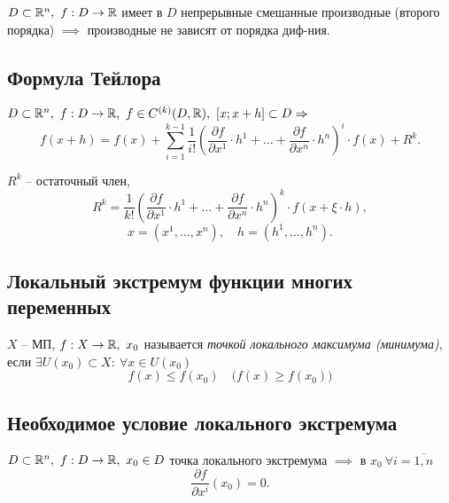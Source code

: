 \begin{theorem}
    $ D \subset \mathbb{R}^n, \ f: D \rightarrow\mathbb{R} $ имеет в $ D $ непрерывные смешанные производные (второго порядка) $ \implies $ производные не зависят от порядка диф-ния.
\end{theorem}

\subsection{Формула Тейлора}

\begin{theorem}
    $ D \subset \mathbb{R}^n, \ f:D\rightarrow\mathbb{R}, \ f\in C^{(k)}(D,\mathbb{R}), \ [x;x+h] \subset D \Rightarrow $
    \[
        f(x + h) = f(x) + \sum_{i=1}^{k-1}\frac{1}{i!}\left(\frac{\partial f}{\partial x^1}\cdot h^1 + \ldots + \frac{\partial f}{\partial x^n}\cdot h^n\right)^i \cdot f(x) + R^k.
    \]
\end{theorem}

\begin{note}
    $R^k$ -- остаточный член,
    \[
        R^k = \frac{1}{k!}\left(\frac{\partial f}{\partial x^1}\cdot h^1 + \ldots + \frac{\partial f}{\partial x^n}\cdot h^n\right)^k \cdot f(x + \xi \cdot h),
    \]
    \[
        x = (x^1,\ldots,x^n), \quad h = (h^1,\ldots,h^n).
    \]
\end{note}

\subsection{Локальный экстремум функции многих переменных}

\begin{definition}
    $ X $ -- МП, $ f:X \rightarrow\mathbb{R}, \ x_0 $ называется \emph{точкой локального максимума (минимума)}, если $ \exists U(x_0) \subset X: \ \forall x \in U(x_0) $
    \[
        f(x)\leqslant f(x_0) \quad \big(f(x) \geqslant f(x_0)\big)
    \]
\end{definition}

\subsection{Необходимое условие локального экстремума}

\begin{theorem}
    $ D \subset \mathbb{R}^n, \ f:D \rightarrow\mathbb{R}, \ x_0 \in D $ точка локального экстремума $ \implies $ в $ x_0 \ \forall i = \overline{1,n}$
    \[
        \frac{\partial f}{\partial x^i}(x_0) = 0.
    \]
\end{theorem}


